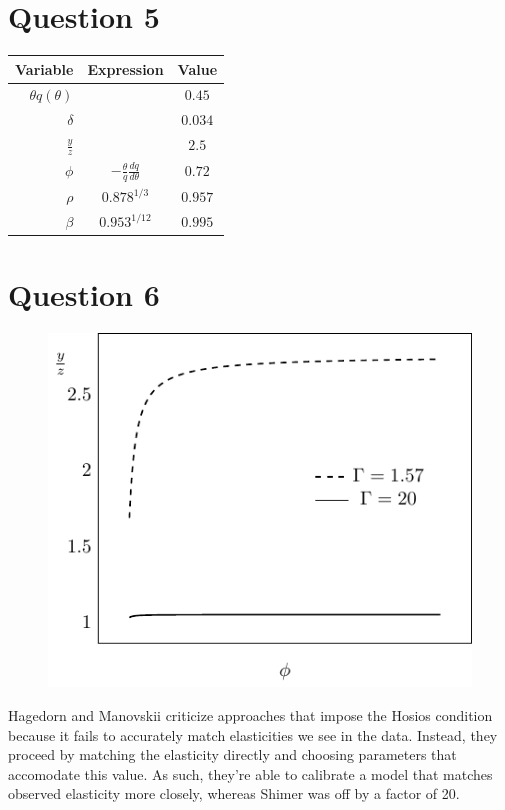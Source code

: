 \documentclass[11pt]{article}
\begin{document}
\section{Question 5}
\label{sec:org746bf03}
\begin{table}[htp]
\begin{center}
\begin{tabular}{rcc}
Variable & Expression & Value\\
\toprule
$\theta q(\theta)$ & &$0.45$  \\
$\delta $ && $0.034$  \\
$\frac{y}{z}$ & &$2.5$  \\
$\phi$ & $-\frac{\theta}{q} \frac{dq}{d \theta}$& $0.72$ \\
$\rho$ & $0.878^{1/3}$ & $0.957$ \\
$\beta$ & $0.953^{1/12}$ & $0.995$ 
\end{tabular}
\end{center}
\end{table}

\newpage

\section{Question 6}
\label{sec:orgbe874ac}
\begin{figure}[htp]
\begin{center}
\includegraphics[width=.5\textwidth, keepaspectratio=true]{yz_plot.pdf}
\end{center}
\end{figure}
Hagedorn and Manovskii criticize approaches that impose the Hosios condition because it fails to accurately match elasticities we see in the data. Instead, they proceed by matching the elasticity directly  and choosing parameters that accomodate this value. As such, they're able to calibrate a model that matches observed elasticity more closely, whereas Shimer was off by a factor of 20.
\end{document}
